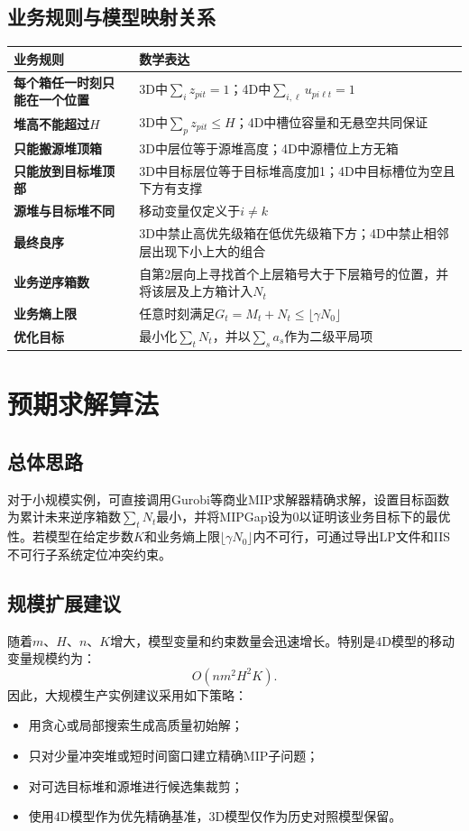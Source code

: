 \documentclass[11pt,a4paper]{ctexart}
\begin{document}
\subsection{业务规则与模型映射关系}
\begin{table}[H]
\centering
\renewcommand{\arraystretch}{1.35}
\begin{tabularx}{0.95\textwidth}{>{\bfseries}p{4.0cm} X}
\toprule
业务规则 & 数学表达 \\
\midrule
每个箱任一时刻只能在一个位置 & 3D中$\sum_i z_{pit}=1$；4D中$\sum_{i,\ell}u_{pi\ell t}=1$ \\
堆高不能超过$H$ & 3D中$\sum_p z_{pit}\le H$；4D中槽位容量和无悬空共同保证 \\
只能搬源堆顶箱 & 3D中层位等于源堆高度；4D中源槽位上方无箱 \\
只能放到目标堆顶部 & 3D中目标层位等于目标堆高度加1；4D中目标槽位为空且下方有支撑 \\
源堆与目标堆不同 & 移动变量仅定义于$i\ne k$ \\
最终良序 & 3D中禁止高优先级箱在低优先级箱下方；4D中禁止相邻层出现下小上大的组合 \\
业务逆序箱数 & 自第2层向上寻找首个上层箱号大于下层箱号的位置，并将该层及上方箱计入$N_t$ \\
业务熵上限 & 任意时刻满足$G_t=M_t+N_t\le \lfloor \gamma N_0\rfloor$ \\
优化目标 & 最小化$\sum_t N_t$，并以$\sum_s a_s$作为二级平局项 \\
\bottomrule
\end{tabularx}
\end{table}

\section{预期求解算法}

\subsection{总体思路}
对于小规模实例，可直接调用Gurobi等商业MIP求解器精确求解，设置目标函数为累计未来逆序箱数$\sum_t N_t$最小，并将MIPGap设为0以证明该业务目标下的最优性。若模型在给定步数$K$和业务熵上限$\lfloor\gamma N_0\rfloor$内不可行，可通过导出LP文件和IIS不可行子系统定位冲突约束。

\subsection{规模扩展建议}
随着$m$、$H$、$n$、$K$增大，模型变量和约束数量会迅速增长。特别是4D模型的移动变量规模约为：
\[
O(nm^2H^2K).
\]
因此，大规模生产实例建议采用如下策略：
\begin{itemize}
    \item 用贪心或局部搜索生成高质量初始解；
    \item 只对少量冲突堆或短时间窗口建立精确MIP子问题；
    \item 对可选目标堆和源堆进行候选集裁剪；
    \item 使用4D模型作为优先精确基准，3D模型仅作为历史对照模型保留。
\end{itemize}
\end{document}
